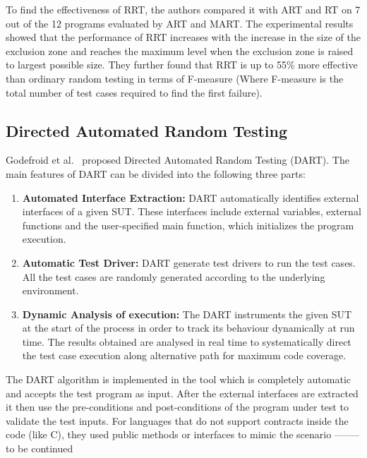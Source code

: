 To find the effectiveness of RRT, the authors compared it with ART and RT on 7 out of the 12 programs evaluated by ART and MART. The experimental results showed that the performance of RRT increases with the increase in the size of the exclusion zone and reaches the maximum level when the exclusion zone is raised to largest possible size. %
They further found that RRT is up to 55\% more effective than ordinary random testing in terms of F-measure (Where F-measure is the total number of test cases required to find the first failure).



\subsection{Directed Automated Random Testing}
Godefroid et al.~\cite{Godefroid2005} proposed Directed Automated Random Testing (DART). %
The main features of DART can be divided into the following three parts:
\begin{enumerate}
\item {\bf Automated Interface Extraction:} DART automatically identifies external interfaces of a given SUT. These interfaces include external variables, external functions and the user-specified main function, which initializes the program execution.
\item {\bf Automatic Test Driver:} DART generate test drivers to run the test cases. All the test cases are randomly generated according to the underlying environment.
\item {\bf Dynamic Analysis of execution:} The DART instruments the given SUT at the start of the process in order to track its behaviour dynamically at run time. The results obtained are analysed in real time to systematically direct the test case execution along alternative path for maximum code coverage.
\end{enumerate}

The DART algorithm is implemented in the tool which is completely automatic and accepts the test program as input. After the external interfaces are extracted it then use the pre-conditions and post-conditions of the program under test to validate the test inputs. For languages that do not support contracts inside the code (like C), they used public methods or interfaces to mimic the scenario -------- to be continued

